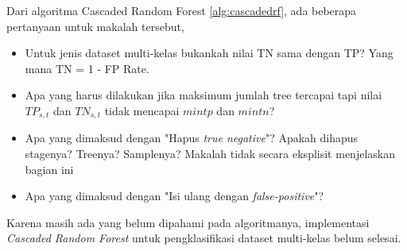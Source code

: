 Dari algoritma Cascaded Random Forest \ref{alg:cascadedrf}, ada beberapa
pertanyaan untuk makalah tersebut,
\begin{itemize}
\item Untuk jenis dataset multi-kelas bukankah nilai TN sama dengan TP? Yang
mana TN = 1 - FP Rate.
\item Apa yang harus dilakukan jika maksimum jumlah tree tercapai tapi nilai
$TP_{s,t}$ dan $TN_{s,t}$ tidak mencapai $mintp$ dan $mintn$?
\item Apa yang dimaksud dengan "Hapus \textit{true negative}"? Apakah dihapus
stagenya? Treenya? Samplenya? Makalah tidak secara eksplisit menjelaskan
bagian ini
\item Apa yang dimaksud dengan "Isi ulang dengan \textit{false-positive}"?
\end{itemize}

Karena masih ada yang belum dipahami pada algoritmanya, implementasi
\textit{Cascaded Random Forest} untuk pengklasifikasi dataset multi-kelas belum
selesai.

